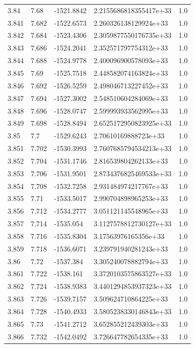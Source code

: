 \begin{tabular}{lllll}
3.84 & 7.68 & -1521.8842 & 2.2155686818355417e+33 & 1.0 \\
3.841 & 7.682 & -1522.6573 & 2.260326138129924e+33 & 1.0 \\
3.842 & 7.684 & -1523.4306 & 2.3059877550176735e+33 & 1.0 \\
3.843 & 7.686 & -1524.2041 & 2.352571797754312e+33 & 1.0 \\
3.844 & 7.688 & -1524.9778 & 2.400096900578093e+33 & 1.0 \\
3.845 & 7.69 & -1525.7518 & 2.448582074163824e+33 & 1.0 \\
3.846 & 7.692 & -1526.5259 & 2.498046713227452e+33 & 1.0 \\
3.847 & 7.694 & -1527.3002 & 2.548510604284069e+33 & 1.0 \\
3.848 & 7.696 & -1528.0747 & 2.599993933562995e+33 & 1.0 \\
3.849 & 7.698 & -1528.8494 & 2.6525172950823925e+33 & 1.0 \\
3.85 & 7.7 & -1529.6243 & 2.70610169888723e+33 & 1.0 \\
3.851 & 7.702 & -1530.3993 & 2.7607685794534213e+33 & 1.0 \\
3.852 & 7.704 & -1531.1746 & 2.816539804262133e+33 & 1.0 \\
3.853 & 7.706 & -1531.9501 & 2.8734376825469533e+33 & 1.0 \\
3.854 & 7.708 & -1532.7258 & 2.931484974217767e+33 & 1.0 \\
3.855 & 7.71 & -1533.5017 & 2.990704898965253e+33 & 1.0 \\
3.856 & 7.712 & -1534.2777 & 3.051121145548965e+33 & 1.0 \\
3.857 & 7.714 & -1535.054 & 3.1127578812730127e+33 & 1.0 \\
3.858 & 7.716 & -1535.8304 & 3.17563976165356e+33 & 1.0 \\
3.859 & 7.718 & -1536.6071 & 3.239791940281243e+33 & 1.0 \\
3.86 & 7.72 & -1537.384 & 3.305240078882794e+33 & 1.0 \\
3.861 & 7.722 & -1538.161 & 3.3720103575863527e+33 & 1.0 \\
3.862 & 7.724 & -1538.9383 & 3.4401294853937323e+33 & 1.0 \\
3.863 & 7.726 & -1539.7157 & 3.509624710864225e+33 & 1.0 \\
3.864 & 7.728 & -1540.4933 & 3.5805238330146843e+33 & 1.0 \\
3.865 & 7.73 & -1541.2712 & 3.652855212439303e+33 & 1.0 \\
3.866 & 7.732 & -1542.0492 & 3.726647782654335e+33 & 1.0 \\

\end{tabular}
